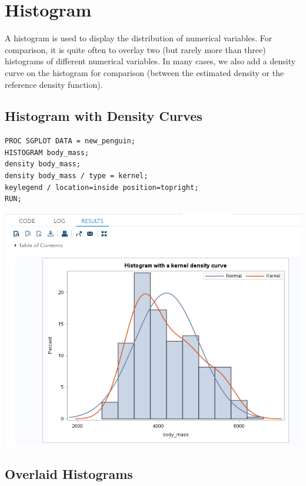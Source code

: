 \documentclass[
]{book}
\begin{document}
\hypertarget{histogram}{%
\section{Histogram}\label{histogram}}

A histogram is used to display the distribution of numerical variables. For comparison, it is quite often to overlay two (but rarely more than three) histograms of different numerical variables. In many cases, we also add a density curve on the histogram for comparison (between the estimated density or the reference density function).

\hypertarget{histogram-with-density-curves}{%
\subsection{Histogram with Density Curves}\label{histogram-with-density-curves}}

\begin{verbatim}
PROC SGPLOT DATA = new_penguin;
HISTOGRAM body_mass;
density body_mass;
density body_mass / type = kernel;
keylegend / location=inside position=topright;
RUN;
\end{verbatim}

\begin{center}\includegraphics[width=1\linewidth]{img06/w06-HistDensity} \end{center}

\hypertarget{overlaid-histograms}{%
\subsection{Overlaid Histograms}\label{overlaid-histograms}}
\end{document}
